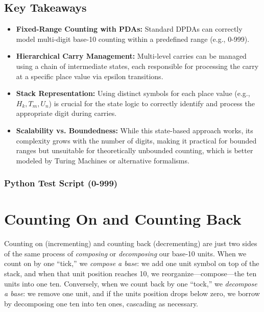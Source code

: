 \documentclass[11pt]{article}
\begin{document}
\subsection{Key Takeaways}
\begin{itemize}
    \item \textbf{Fixed-Range Counting with PDAs:} Standard DPDAs can correctly model multi-digit base-10 counting within a predefined range (e.g., 0-999).
    \item \textbf{Hierarchical Carry Management:} Multi-level carries can be managed using a chain of intermediate states, each responsible for processing the carry at a specific place value via epsilon transitions.
    \item \textbf{Stack Representation:} Using distinct symbols for each place value (e.g., $H_k, T_m, U_n$) is crucial for the state logic to correctly identify and process the appropriate digit during carries.
    \item \textbf{Scalability vs. Boundedness:} While this state-based approach works, its complexity grows with the number of digits, making it practical for bounded ranges but unsuitable for theoretically unbounded counting, which is better modeled by Turing Machines or alternative formalisms.
\end{itemize}

\subsubsection*{Python Test Script (0-999)}


\printbibliography

\section{Counting On and Counting Back}\label{sec:count_on_back}

Counting on (incrementing) and counting back (decrementing) are just two sides of the same process of \emph{composing} or \emph{decomposing} our base‑10 units.  When we count on by one “tick,” we \emph{compose a base}: we add one unit symbol on top of the stack, and when that unit position reaches 10, we reorganize—compose—the ten units into one ten.  Conversely, when we count back by one “tock,” we \emph{decompose a base}: we remove one unit, and if the units position drops below zero, we borrow by decomposing one ten into ten ones, cascading as necessary.
\end{document}
